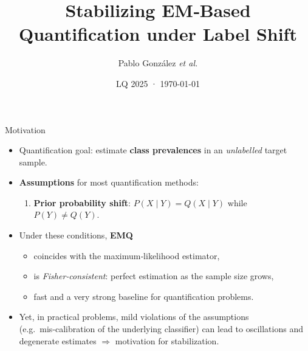 \documentclass[aspectratio=169]{beamer}
\title[Stabilizing EM‑Based Quantification]{Stabilizing EM‑Based Quantification under Label Shift}
\author{Pablo González \textit{et al.}}
\institute[AI Center, Uni. Oviedo]{Artificial Intelligence Center\\University of Oviedo}
\date{LQ 2025 · \today}
\begin{document}
\begin{frame}
  \titlepage
\end{frame}

\begin{frame}{Motivation}
  \begin{itemize}
    \item \alert{Quantification goal}: estimate \textbf{class prevalences} in an \emph{unlabelled} target sample.
    \item \textbf{Assumptions} for most quantification methods:
          \begin{enumerate}
            \item \textbf{Prior probability shift}: $P(X\mid Y)=Q(X\mid Y)$ while $P(Y)\neq Q(Y)$.
          \end{enumerate}
    \item Under these conditions,  \textbf{EMQ}
          \begin{itemize}
            \item coincides with the maximum‑likelihood estimator,
            \item is \emph{Fisher‑consistent}: perfect estimation as the sample size grows,
            \item fast and a very strong baseline for quantification problems.
          \end{itemize}
    \item Yet, in practical problems, mild violations of the assumptions (e.g.\ mis‑calibration of the underlying classifier) can lead to oscillations and degenerate estimates $\Rightarrow$ motivation for stabilization.
  \end{itemize}
\end{frame}
\end{document}
